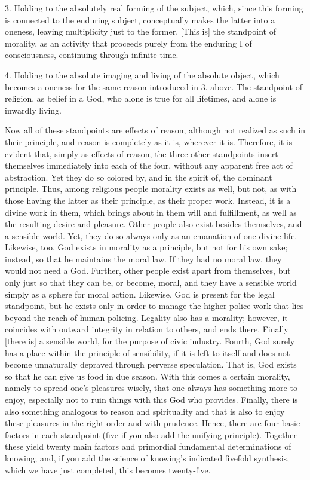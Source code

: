 3. Holding to the absolutely
real forming of the subject,
which, since this forming is
connected to the enduring subject,
conceptually makes the latter into a oneness,
leaving multiplicity just to the former.
[This is] the standpoint of morality,
as an activity that proceeds purely
from the enduring I of consciousness,
continuing through infinite time.

4. Holding to the absolute
imaging and living of the absolute object,
which becomes a oneness
for the same reason introduced in 3. above.
The standpoint of religion,
as belief in a God,
who alone is true for all lifetimes,
and alone is inwardly living.

Now all of these standpoints are effects of reason,
although not realized as such in their principle,
and reason is completely as it is, wherever it is.
Therefore, it is evident that, simply as effects of reason,
the three other standpoints insert themselves
immediately into each of the four,
without any apparent free act of abstraction.
Yet they do so colored by,
and in the spirit of,
the dominant principle.
Thus, among religious people morality exists as well,
but not, as with those having the latter as their principle,
as their proper work.
Instead, it is a divine work in them,
which brings about in them will and fulfillment,
as well as the resulting desire and pleasure.
Other people also exist besides themselves, and a sensible world.
Yet, they do so always only as an emanation of one divine life.
Likewise, too, God exists in morality as a principle,
but not for his own sake;
instead, so that he maintains the moral law.
If they had no moral law, they would not need a God.
Further, other people exist apart from themselves,
but only just so that they can be, or become, moral,
and they have a sensible world simply as a sphere for moral action.
Likewise, God is present for the legal standpoint,
but he exists only in order to manage the
higher police work that lies beyond the reach of human policing.
Legality also has a morality;
however, it coincides with outward integrity
in relation to others, and ends there.
Finally [there is] a sensible world,
for the purpose of civic industry.
Fourth, God surely has a place within the principle of sensibility,
if it is left to itself and does not become
unnaturally depraved through perverse speculation.
That is, God exists so that he can give us food in due season.
With this comes a certain morality,
namely to spread one's pleasures wisely,
that one always has something more to enjoy,
especially not to ruin things
with this God who provides.
Finally, there is also something analogous
to reason and spirituality
and that is also to enjoy these pleasures
in the right order and with prudence.
Hence, there are four basic factors in each standpoint
(five if you also add the unifying principle).
Together these yield twenty main factors
and primordial fundamental determinations of knowing;
and, if you add the science of knowing's
indicated fivefold synthesis,
which we have just completed,
this becomes twenty-five.

